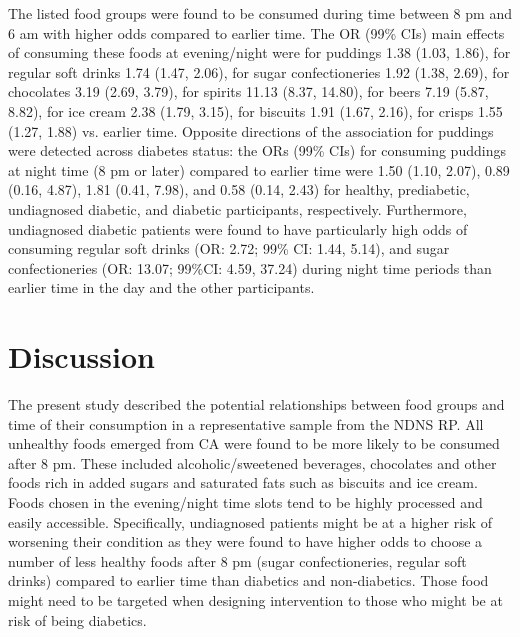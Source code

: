 \documentclass{bmcart}
\begin{document}
The listed food groups were found to be consumed during time between 8 pm and 6 am with higher odds compared to earlier time. The OR (99\% CIs) main effects of consuming these foods at evening/night were for puddings 1.38 (1.03, 1.86), for regular soft drinks 1.74 (1.47, 2.06), for sugar confectioneries 1.92 (1.38, 2.69), for chocolates 3.19 (2.69, 3.79), for spirits 11.13 (8.37, 14.80), for beers 7.19 (5.87, 8.82), for ice cream 2.38 (1.79, 3.15), for biscuits 1.91 (1.67, 2.16), for crisps 1.55 (1.27, 1.88) vs. earlier time. Opposite directions of the association for puddings were detected across diabetes status: the ORs (99\% CIs) for consuming puddings at night time (8 pm or later) compared to earlier time were 1.50 (1.10, 2.07),	0.89 (0.16, 4.87),	1.81 (0.41, 7.98), and	0.58 (0.14, 2.43) for healthy, prediabetic, undiagnosed diabetic, and diabetic participants, respectively. Furthermore, undiagnosed diabetic patients were found to have particularly high odds of consuming regular soft drinks (OR: 2.72; 99\% CI: 1.44, 5.14), and sugar confectioneries (OR: 13.07; 99\%CI: 4.59, 37.24) during night time periods than earlier time in the day and the other participants. 




\section*{Discussion}


The present study described the potential relationships between food groups and time of their consumption in a representative sample from the NDNS RP. All unhealthy foods emerged from CA were found to be more likely to be consumed after 8 pm. These included alcoholic/sweetened beverages, chocolates and other foods rich in added sugars and saturated fats such as biscuits and ice cream. Foods chosen in the evening/night time slots tend to be highly processed and easily accessible. Specifically, undiagnosed patients might be at a higher risk of worsening their condition as they were found to have higher odds to choose a number of less healthy foods after 8 pm (sugar confectioneries, regular soft drinks) compared to earlier time than diabetics and non-diabetics. Those food might need to be targeted when designing intervention to those who might be at risk of being diabetics. 
\end{document}
